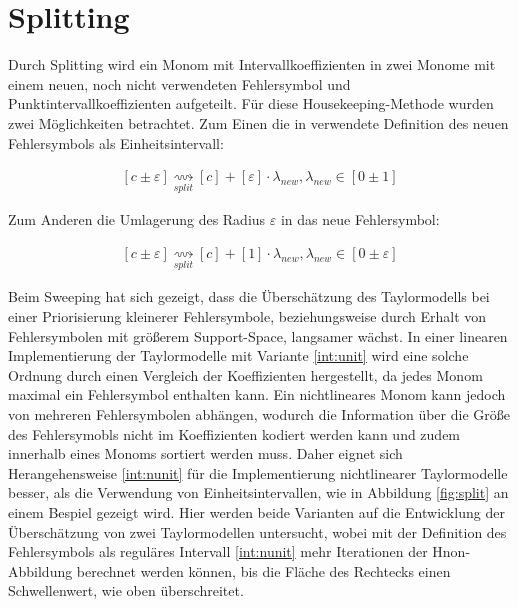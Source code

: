 
 
 \section{Splitting}
 Durch Splitting wird ein Monom mit Intervallkoeffizienten in zwei Monome mit einem neuen, noch nicht verwendeten Fehlersymbol und Punktintervallkoeffizienten aufgeteilt. Für diese Housekeeping-Methode wurden zwei Möglichkeiten betrachtet. Zum Einen die in \cite{DBLP:conf/macis/BrausseKM15} verwendete Definition des neuen Fehlersymbols als Einheitsintervall:
 
\begin{align}
\label{int:unit}
 [c \pm \varepsilon]  \underset{split}{\rightsquigarrow} [c] + [\varepsilon] \cdot \lambda_{new}, \lambda_{new} \in [0 \pm 1]
\end{align}

Zum Anderen die Umlagerung des Radius $\varepsilon$ in das neue Fehlersymbol:

\begin{align}
\label{int:nunit}
 [c \pm \varepsilon]  \underset{split}{\rightsquigarrow} [c] + [1] \cdot \lambda_{new}, \lambda_{new} \in [0 \pm \varepsilon]
\end{align}
 
Beim Sweeping hat sich gezeigt, dass die Überschätzung des Taylormodells bei einer Priorisierung kleinerer Fehlersymbole, beziehungsweise durch Erhalt von Fehlersymbolen mit größerem Support-Space, langsamer wächst. In einer linearen Implementierung der Taylormodelle mit Variante \ref{int:unit} wird eine solche Ordnung durch einen Vergleich der Koeffizienten hergestellt, da jedes Monom maximal ein Fehlersymbol enthalten kann. Ein nichtlineares Monom kann jedoch von mehreren Fehlersymbolen abhängen, wodurch die Information über die Größe des Fehlersymobls nicht im Koeffizienten kodiert werden kann und zudem innerhalb eines Monoms sortiert werden muss. Daher eignet sich Herangehensweise \ref{int:nunit} für die Implementierung nichtlinearer Taylormodelle besser, als die Verwendung von Einheitsintervallen, wie in Abbildung \ref{fig:split} an einem Bespiel gezeigt wird. Hier werden beide Varianten auf die Entwicklung der Überschätzung von zwei Taylormodellen untersucht, wobei mit der Definition des Fehlersymbols als reguläres Intervall \ref{int:nunit} mehr Iterationen der H\e non-Abbildung berechnet werden können, bis die Fläche des Rechtecks einen Schwellenwert, wie oben überschreitet.
 
 
